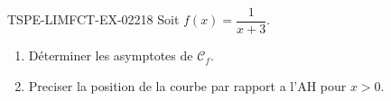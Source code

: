\begin{exercice}{TSPE-LIMFCT-EX-022}{1}{8}
Soit $f(x) = \dfrac{1}{x+3}$.
\begin{enumerate}
  \item Déterminer les asymptotes de $\mathcal{C}_f$.
  \item Preciser la position de la courbe par rapport a l'AH pour $x > 0$.
\end{enumerate}
\end{exercice}
